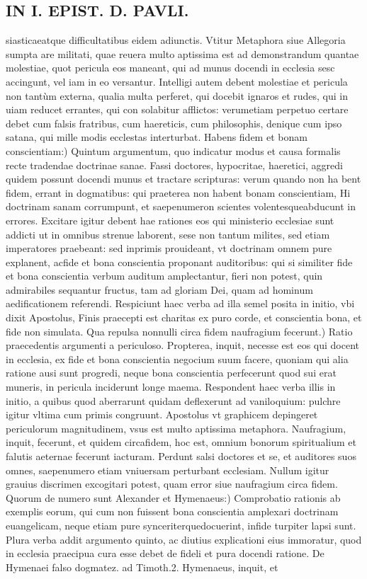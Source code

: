 \documentclass{article}
\begin{document}
\begin{pages}
\section*{IN I. EPIST. D. PAVLI. }
\marginpar{[ p.60 ]}\pstart siasticaeatque  difficultatibus eidem adiunctis. Vtitur Metaphora siue Allegoria sumpta are militati, quae reuera multo aptissima est ad demonstrandum quantae molestiae, quot pericula eos maneant, qui ad munus docendi in ecclesia sesc accingunt, vel iam in eo versantur. Intelligi autem debent molestiae et pericula non tantùm externa, qualia multa perferet, qui docebit ignaros et rudes, qui in uiam reducet errantes, qui con solabitur afflictos: verumetiam perpetuo certare debet cum falsis fratribus, cum haereticis, cum philosophis, denique  cum ipso satana, qui mille modis ecclestas interturbat.  \pend\pstart Habens fidem et bonam conscientiam:) Quintum argumentum, quo indicatur modus et causa formalis recte tradendae doctrinae sanae. Fassi doctores, hypocritae, haeretici, aggredi quidem possunt docendi munus et tractare scripturas: verum quando non ha bent fidem, errant in dogmatibus: qui praeterea non habent bonam conscientiam, Hi doctrinam sanam corrumpunt, et saepenumeron scientes volentesqueabducunt in errores. Excitare igitur debent hae rationes eos qui ministerio ecclesiae sunt addicti ut in omnibus strenue laborent, sese non tantum milites, sed etiam imperatores praebeant: sed inprimis prouideant, vt doctrinam omnem pure explanent, acfide et bona conscientia proponant auditoribus: qui si similiter fide et bona conscientia verbum auditum amplectantur, fieri non potest, quin admirabiles sequantur fructus, tam ad gloriam Dei, quam ad hominum aedificationem referendi. Respiciunt haec verba ad illa semel posita in initio, vbi dixit Apostolus, Finis praecepti est charitas ex puro corde, et conscientia bona, et fide non simulata.  \pend{} Qua repulsa nonnulli circa fidem naufragium fecerunt.) Ratio praecedentis argumenti a periculoso. Propterea, inquit, necesse est eos qui docent in ecclesia, ex fide et bona conscientia negocium suum facere, quoniam qui alia ratione ausi sunt progredi, neque  bona conscientia perfecerunt quod sui erat muneris, in pericula inciderunt longe maema. Respondent haec verba illis in initio, a quibus quod aberrarunt quidam deflexerunt ad vaniloquium: pulchre igitur vltima cum primis congruunt. Apostolus vt graphicem depingeret periculorum magnitudinem, vsus est multo aptissima metaphora. Naufragium, inquit, fecerunt, et quidem circafidem, hoc est, omnium bonorum spiritualium et falutis aeternae fecerunt iacturam. Perdunt salsi doctores et se, et auditores suos omnes, saepenumero etiam vniuersam perturbant ecclesiam. Nullum igitur grauius discrimen excogitari potest, quam error siue naufragium circa fidem.  \pend\pstart Quorum de numero sunt Alexander et Hymenaeus:) Comprobatio rationis ab exemplis eorum, qui cum non fuissent bona conscientia amplexari doctrinam euangelicam, neque  etiam pure synceriterquedocuerint, infide turpiter lapsi sunt. Plura verba addit argumento quinto, ac diutius explicationi eius immoratur, quod in ecclesia praecipua cura esse debet de fideli et pura docendi ratione. De Hymenaei falso dogmatez. ad Timoth.2. Hymenaeus, inquit, et 
\end{pages}
\end{document}
